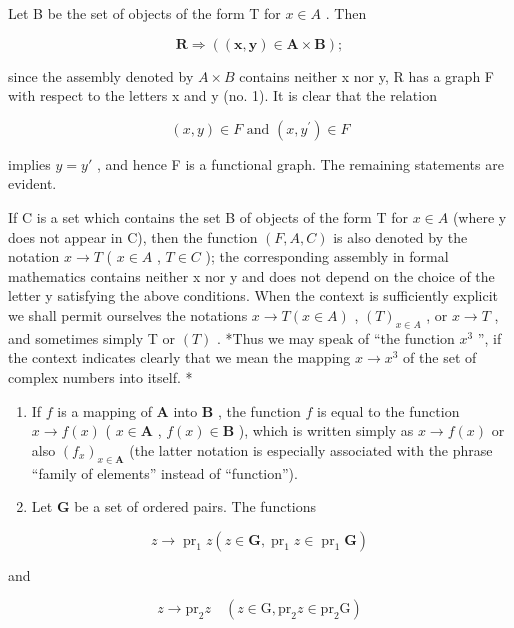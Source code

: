 Let B be the set of objects of the form T for \(x \in A\) . Then

\[
\boldsymbol {R} \Longrightarrow ((\boldsymbol {x}, \boldsymbol {y}) \in \boldsymbol {A} \times \boldsymbol {B});
\]

since the assembly denoted by \(A \times B\) contains neither x nor y, R has a graph F with respect to the letters x and y (no. 1). It is clear that the relation

\[
(x, y) \in F \text {   and   } (x, y ^ {\prime}) \in F
\]

implies \(y = y'\) , and hence F is a functional graph. The remaining statements are evident.

If C is a set which contains the set B of objects of the form T for \(x \in A\) (where y does not appear in C), then the function \((F, A, C)\) is also denoted by the notation \(x \to T\) ( \(x \in A\) , \(T \in C\) ); the corresponding assembly in formal mathematics contains neither x nor y and does not depend on the choice of the letter y satisfying the above conditions. When the context is sufficiently explicit we shall permit ourselves the notations \(x \to T(x \in A)\) , \((T)_{x \in A}\) , or \(x \to T\) , and sometimes simply T or \((T)\) . *Thus we may speak of ``the function \(x^{3}\) '', if the context indicates clearly that we mean the mapping \(x \to x^{3}\) of the set of complex numbers into itself. *


\begin{enumerate}
\def\labelenumi{(\arabic{enumi})}
\item
  If \(f\) is a mapping of \(\mathbf{A}\) into \(\mathbf{B}\) , the function \(f\) is equal to the function \(x \to f(x)\) ( \(x \in \mathbf{A}\) , \(f(x) \in \mathbf{B}\) ), which is written simply as \(x \to f(x)\) or also \((f_x)_{x \in \mathbf{A}}\) (the latter notation is especially associated with the phrase ``family of elements'' instead of ``function'').
\item
  Let \(\mathbf{G}\) be a set of ordered pairs. The functions
\end{enumerate}

\[
z \rightarrow \operatorname{pr} _ {1} z (z \in \mathbf {G}, \operatorname{pr} _ {1} z \in \operatorname{pr} _ {1} \mathbf {G})
\]

and

\[
z \rightarrow \mathrm{pr} _ {2} z \quad (z \in \mathrm{G}, \mathrm{pr} _ {2} z \in \mathrm{pr} _ {2} \mathrm{G})
\]

